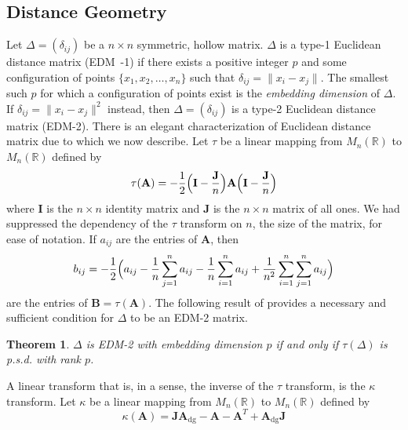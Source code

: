 \documentclass[10pt,twocolumn]{article}
\newtheorem{theorem}{Theorem}
\numberwithin{equation}{section}
\begin{document}
\subsection{Distance Geometry}
\label{sec:distance-geometry}
Let $\Delta = (\delta_{ij})$ be a $n \times n$ symmetric, hollow
matrix. $\Delta$ is a type-1 Euclidean distance matrix ({EDM~-1}) if
there exists a positive integer $p$ and some configuration of points
$\{x_1,x_2,\dots, x_n\}$ such that $\delta_{ij} = \| x_i - x_j
\|$. The smallest such $p$ for which a configuration of points exist
is the {\em embedding dimension} of $\Delta$. If $\delta_{ij} = \| x_i
- x_j\|^{2}$ instead, then $\Delta = (\delta_{ij})$ is a type-2
Euclidean distance matrix (EDM-2). There is an elegant characterization
of Euclidean distance matrix due to \cite{schoenberg35:_remar_mauric_frech_sur_hilber} which
we now describe. Let $\tau$ be a linear mapping from $M_n(\mathbb{R})$
to $M_n(\mathbb{R})$ defined by
\begin{equation}
  \label{eq:1}
  \tau(\mathbf{A}) = -\frac{1}{2} \Bigl(\mathbf{I} -
  \frac{\mathbf{J}}{n}\Bigr) \mathbf{A} \Bigl(\mathbf{I} -
  \frac{\mathbf{J}}{n} \Bigr)
\end{equation}
where $\mathbf{I}$ is the $n \times n$ identity matrix and
$\mathbf{J}$ is the $n \times n$ matrix of all ones.  We had
suppressed the dependency of the $\tau$ transform on $n$, the size of
the matrix, for ease of notation. If $a_{ij}$ are the entries of
$\mathbf{A}$, then
\begin{equation*}
  b_{ij} = -\frac{1}{2}\Bigl(a_{ij} - \frac{1}{n}\sum_{j=1}^{n}a_{ij} -
  \frac{1}{n}\sum_{i=1}^{n}{a_{ij}} +
  \frac{1}{n^2}\sum_{i=1}^{n}\sum_{j=1}^{n}a_{ij}\Bigr)
\end{equation*}
are the entries of $\mathbf{B} = \tau(\mathbf{A})$. The following
result of \cite{schoenberg35:_remar_mauric_frech_sur_hilber} provides a necessary and
sufficient condition for $\Delta$ to be an EDM-2 matrix.
\begin{theorem}
  \label{thm:1}
  $\Delta$ is EDM-2 with embedding dimension $p$ if and only
  if $\tau(\Delta)$ is p.s.d. with rank
  $p$. 
\end{theorem}
A linear transform that is, in a sense, the inverse of the $\tau$
transform, is the $\kappa$ transform. Let $\kappa$ be a linear mapping
from $M_n(\mathbb{R})$ to $M_n(\mathbb{R})$ defined by
\begin{equation}
  \label{eq:2}
  \kappa(\mathbf{A}) = \mathbf{J}\mathbf{A}_{\mathrm{dg}} -
  \mathbf{A} - \mathbf{A}^{T} + \mathbf{A}_{\mathrm{dg}}\mathbf{J}
\end{equation}
\end{document}
